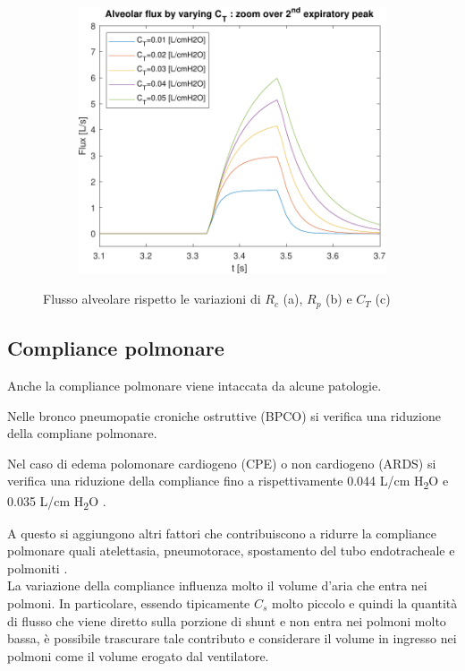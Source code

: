 \begin{figure}[t!]
\begin{subfigure}{0.33\linewidth}
	\centering
	\includegraphics[width=0.95\linewidth]{../model/data_log/CwCL_alveolar_flux_zoom.pdf}
	\caption{}
\end{subfigure}\hfill
	\caption{Flusso alveolare rispetto le variazioni di $R_c$ (a), $R_p$ (b) e $C_T$ (c)}
\label{fig:flux_alveolar}
\end{figure}



\subsection{Compliance polmonare}

Anche la compliance polmonare viene intaccata da alcune patologie.

Nelle bronco pneumopatie croniche ostruttive (BPCO) si verifica una riduzione della compliane polmonare.

Nel caso di edema polomonare cardiogeno (CPE) o non cardiogeno (ARDS) si verifica una riduzione della compliance fino a rispettivamente 0.044 L/cm H\textsubscript{2}O e 0.035 L/cm H\textsubscript{2}O \cite{milic-emili_basics_1999}.

A questo si aggiungono altri fattori che contribuiscono a ridurre la compliance polmonare quali atelettasia, pneumotorace, spostamento del tubo endotracheale e polmoniti \cite{grossbach_overview_2011}.
\\

La variazione della compliance influenza molto il volume d'aria che entra nei polmoni. In particolare, essendo tipicamente $C_s$ molto piccolo e quindi la quantità di flusso che viene diretto sulla porzione di shunt e non entra nei polmoni molto bassa, è possibile trascurare tale contributo e considerare il volume in ingresso nei polmoni come il volume erogato dal ventilatore.

